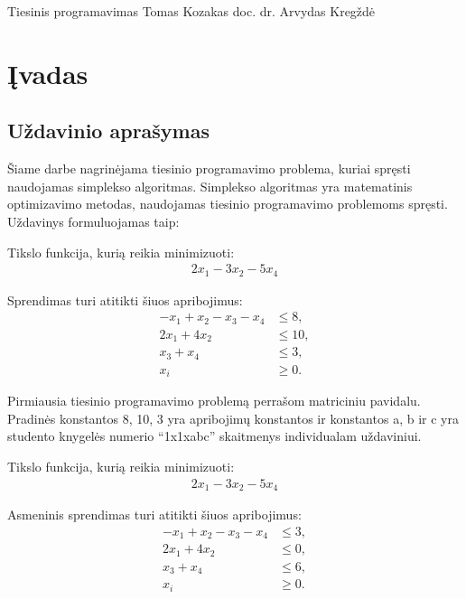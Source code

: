 \documentclass[a4paper,12pt,fleqn]{article}
\begin{document}
 {Tiesinis programavimas}
 {Tomas Kozakas} 
 {}{}{}{}
 {doc. dr. Arvydas Kregždė}

\tableofcontents
\pagebreak

\section{Įvadas}
\subsection{Uždavinio aprašymas}
Šiame darbe nagrinėjama tiesinio programavimo problema, kuriai spręsti naudojamas simplekso algoritmas. Simplekso algoritmas yra matematinis optimizavimo metodas, naudojamas tiesinio programavimo problemoms spręsti.
Uždavinys formuluojamas taip:

Tikslo funkcija, kurią reikia minimizuoti:
\begin{align}
2x_1 - 3x_2 - 5x_4
\end{align}

Sprendimas turi atitikti šiuos apribojimus:
\begin{equation}
\begin{aligned}
-x_1 + x_2 - x_3 - x_4 &\leq 8, \\
2x_1 + 4x_2 &\leq 10, \\
x_3 + x_4 &\leq 3, \\
x_i &\geq 0.
\end{aligned}
\end{equation}

Pirmiausia tiesinio programavimo problemą perrašom matriciniu pavidalu. Pradinės konstantos 8, 10, 3 yra apribojimų konstantos ir konstantos a, b ir c yra studento knygelės numerio \enquote{1x1xabc} skaitmenys individualam uždaviniui.

Tikslo funkcija, kurią reikia minimizuoti:
\begin{align}
2x_1 - 3x_2 - 5x_4
\end{align}

Asmeninis sprendimas turi atitikti šiuos apribojimus:
\begin{equation}
\begin{aligned}
-x_1 + x_2 - x_3 - x_4 &\leq 3, \\
2x_1 + 4x_2 &\leq 0, \\
x_3 + x_4 &\leq 6, \\
x_i &\geq 0.
\end{aligned}
\end{equation}
\end{document}
